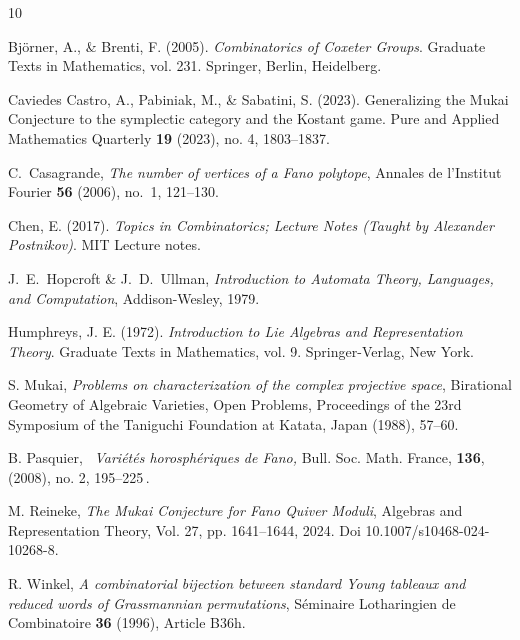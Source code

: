 \documentclass[11pt,a4paper]{amsart}
\theoremstyle{plain}
\theoremstyle{definition}
\theoremstyle{remark}
\begin{document}
\begin{thebibliography}{10}

Björner, A., \& Brenti, F. (2005). \textit{Combinatorics of Coxeter Groups}. Graduate Texts in Mathematics, vol. 231. Springer, Berlin, Heidelberg.

Caviedes Castro, A., Pabiniak, M., \& Sabatini, S. (2023). Generalizing the Mukai Conjecture to the symplectic category and the Kostant game. Pure and Applied Mathematics Quarterly \textbf{19} (2023), no. 4, 1803--1837.

C.~Casagrande, \emph{The number of vertices of a Fano polytope}, 
Annales de l'Institut Fourier \textbf{56} (2006), no.~1, 121--130.

Chen, E. (2017). \textit{Topics in Combinatorics; Lecture Notes (Taught by Alexander Postnikov)}. MIT Lecture notes.

J.~E.~Hopcroft \& J.~D.~Ullman,
\emph{Introduction to Automata Theory, Languages, and Computation},
Addison-Wesley, 1979.

Humphreys, J. E. (1972). \textit{Introduction to Lie Algebras and Representation Theory}. Graduate Texts in Mathematics, vol. 9. Springer-Verlag, New York.

S. Mukai,
\emph{Problems on characterization of the complex projective space},
Birational Geometry of Algebraic Varieties, Open Problems, Proceedings of the 23rd Symposium of the Taniguchi Foundation at Katata, Japan (1988), 57--60.

\newblock B. Pasquier, \
\newblock \emph{Vari\'et\'es horosph\'eriques de Fano,}
\newblock Bull. Soc. Math. France, {\bf 136}, (2008), no. 2,
195--225\,.

M. Reineke,
\textit{The Mukai Conjecture for Fano Quiver Moduli},
Algebras and Representation Theory,
Vol. 27, pp. 1641--1644, 2024. Doi 10.1007/s10468-024-10268-8.

R. Winkel,
\textit{A combinatorial bijection between standard Young tableaux and reduced words of Grassmannian permutations},
Séminaire Lotharingien de Combinatoire \textbf{36} (1996), Article B36h.

\end{thebibliography}
\end{document}
